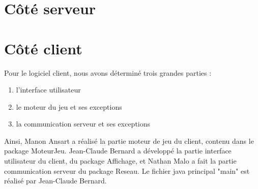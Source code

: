 \section{Côté serveur}

\section{Côté client}
Pour le logiciel client, nous avons déterminé trois grandes parties :
\begin{enumerate}
\item l'interface utilisateur
\item le moteur du jeu et ses exceptions
\item la communication serveur et ses exceptions
\end{enumerate}

Ainsi, Manon Ansart a réalisé la partie moteur de jeu du client, contenu dans le package MoteurJeu. Jean-Claude Bernard a développé la partie interface utilisateur du client, du package Affichage, et Nathan Malo a fait la partie communication serveur du package Reseau. Le fichier java principal "main" est réalisé par Jean-Claude Bernard.
